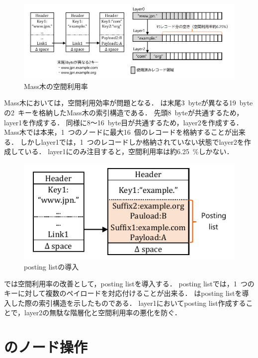 \begin{figure}[t]
    \centering
    \includegraphics{./figures/memory.pdf}
    \caption{Mass木の空間利用率}
    \label{fig:memory}
\end{figure}

Mass木においては，空間利用効率が問題となる．
\Fig{\ref{fig:memory}}は末尾3~byteが異なる19~byteの2~キーを格納したMass木の索引構造である．
先頭8~byteが共通するため，layer1を作成する．
同様に8～16~byte目が共通するため，layer2を作成する．
Mass木では本来，1~つのノードに最大16~個のレコードを格納することが出来る．
しかしlayer1では，1~つのレコードしか格納されていない状態でlayer2を作成している．
layer1にのみ注目すると，空間利用率は約6.25~\%しかない．

\begin{figure}[t]
    \centering
    \includegraphics{./figures/posting_list.pdf}
    \caption{posting listの導入}
    \label{fig:posting_list}
\end{figure}

\Bcforest{}では空間利用率の改善として，posting listを導入する．
posting listでは，1~つのキーに対して複数のペイロードを対応付けることが出来る．
\Fig{\ref{fig:posting_list}}はposting listを導入した際の索引構造を示したものである．
layer1においてposting list作成することで，layer2の無駄な階層化と空間利用率の悪化を防ぐ．


\section{\Bcforest{}のノード操作}
\label{sec:node_operation}

